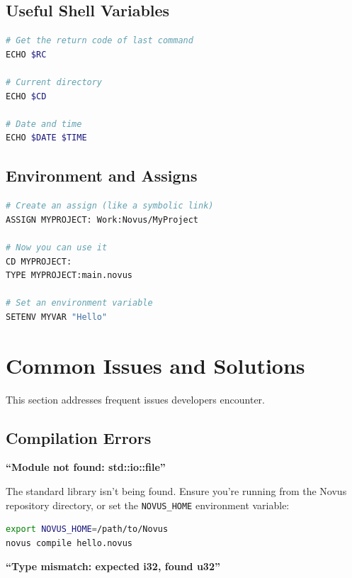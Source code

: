 \subsection{Useful Shell Variables}

\begin{lstlisting}[language=bash]
# Get the return code of last command
ECHO $RC

# Current directory
ECHO $CD

# Date and time
ECHO $DATE $TIME
\end{lstlisting}

\subsection{Environment and Assigns}

\begin{lstlisting}[language=bash]
# Create an assign (like a symbolic link)
ASSIGN MYPROJECT: Work:Novus/MyProject

# Now you can use it
CD MYPROJECT:
TYPE MYPROJECT:main.novus

# Set an environment variable
SETENV MYVAR "Hello"
\end{lstlisting}

\section{Common Issues and Solutions}
\label{sec:common-issues}

This section addresses frequent issues developers encounter.

\subsection{Compilation Errors}

\textbf{``Module not found: std::io::file''}

The standard library isn't being found. Ensure you're running from the Novus repository directory, or set the \texttt{NOVUS\_HOME} environment variable:

\begin{lstlisting}[language=bash]
export NOVUS_HOME=/path/to/Novus
novus compile hello.novus
\end{lstlisting}

\textbf{``Type mismatch: expected i32, found u32''}

